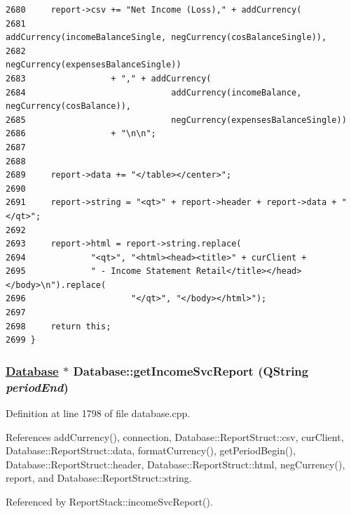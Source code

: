 \begin{verbatim}
2680     report->csv += "Net Income (Loss)," + addCurrency(
2681                                               addCurrency(incomeBalanceSingle, negCurrency(cosBalanceSingle)),
2682                                               negCurrency(expensesBalanceSingle))
2683                 + "," + addCurrency(
2684                             addCurrency(incomeBalance, negCurrency(cosBalance)),
2685                             negCurrency(expensesBalanceSingle))
2686                 + "\n\n";
2687 
2688 
2689     report->data += "</table></center>";
2690 
2691     report->string = "<qt>" + report->header + report->data + "</qt>";
2692 
2693     report->html = report->string.replace(
2694             "<qt>", "<html><head><title>" + curClient +
2695             " - Income Statement Retail</title></head></body>\n").replace(
2696                     "</qt>", "</body></html>");
2697 
2698     return this;
2699 }
\end{verbatim}\normalsize 


\hypertarget{classDatabase_a27}{
\subsubsection[getIncomeSvcReport]{\setlength{\rightskip}{0pt plus 5cm}\hyperlink{classDatabase}{Database} $\ast$ Database::get\-Income\-Svc\-Report (QString {\em period\-End})}}
\label{classDatabase_a27}


Definition at line 1798 of file database.cpp.

References add\-Currency(), connection, Database::Report\-Struct::csv, cur\-Client, Database::Report\-Struct::data, format\-Currency(), get\-Period\-Begin(), Database::Report\-Struct::header, Database::Report\-Struct::html, neg\-Currency(), report, and Database::Report\-Struct::string.

Referenced by Report\-Stack::income\-Svc\-Report().

